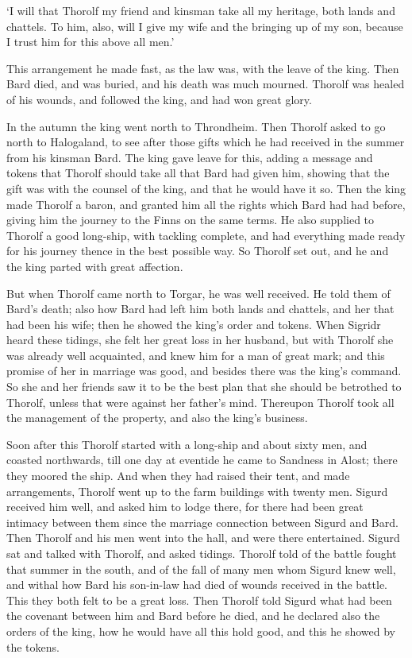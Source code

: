 `I will that Thorolf my friend and kinsman take all my heritage, both lands and chattels. To him, also, will I give my wife and the bringing up of my son, because I trust him for this above all men.'

This arrangement he made fast, as the law was, with the leave of the king. Then Bard died, and was buried, and his death was much mourned. Thorolf was healed of his wounds, and followed the king, and had won great glory.

In the autumn the king went north to Throndheim. Then Thorolf asked to go north to Halogaland, to see after those gifts which he had received in the summer from his kinsman Bard. The king gave leave for this, adding a message and tokens that Thorolf should take all that Bard had given him, showing that the gift was with the counsel of the king, and that he would have it so. Then the king made Thorolf a baron, and granted him all the rights which Bard had had before, giving him the journey to the Finns on the same terms. He also supplied to Thorolf a good long-ship, with tackling complete, and had everything made ready for his journey thence in the best possible way. So Thorolf set out, and he and the king parted with great affection.

But when Thorolf came north to Torgar, he was well received. He told them of Bard's death; also how Bard had left him both lands and chattels, and her that had been his wife; then he showed the king's order and tokens. When Sigridr heard these tidings, she felt her great loss in her husband, but with Thorolf she was already well acquainted, and knew him for a man of great mark; and this promise of her in marriage was good, and besides there was the king's command. So she and her friends saw it to be the best plan that she should be betrothed to Thorolf, unless that were against her father's mind. Thereupon Thorolf took all the management of the property, and also the king's business.

Soon after this Thorolf started with a long-ship and about sixty men, and coasted northwards, till one day at eventide he came to Sandness in Alost; there they moored the ship. And when they had raised their tent, and made arrangements, Thorolf went up to the farm buildings with twenty men. Sigurd received him well, and asked him to lodge there, for there had been great intimacy between them since the marriage connection between Sigurd and Bard. Then Thorolf and his men went into the hall, and were there entertained. Sigurd sat and talked with Thorolf, and asked tidings. Thorolf told of the battle fought that summer in the south, and of the fall of many men whom Sigurd knew well, and withal how Bard his son-in-law had died of wounds received in the battle. This they both felt to be a great loss. Then Thorolf told Sigurd what had been the covenant between him and Bard before he died, and he declared also the orders of the king, how he would have all this hold good, and this he showed by the tokens.

